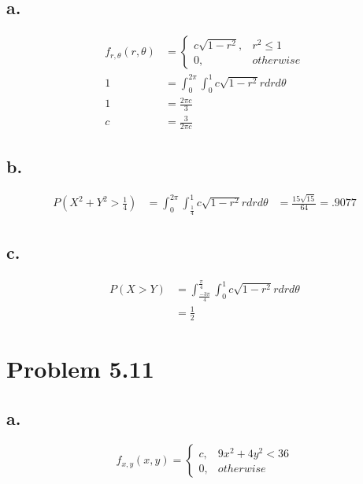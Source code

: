 \documentclass[12pt]{article}
\begin{document}
\subsection*{a.}
\begin{align*}
 f_{r,\theta}(r,\theta) &= 
 \begin{cases}
   c\sqrt{1-r^2}, & r^2 \leq 1 \\
   0, & otherwise
 \end{cases} \\
 1 &= \int_0^{2\pi} \int_0^1 c\sqrt{1-r^2}rdrd\theta \\
 1 &= \frac{2\pi c}{3} \\
 c &= \frac{3}{2\pi c}
\end{align*}

\subsection*{b.}
\begin{align*}
  P(X^2 + Y^2 > \frac{1}{4}) &= \int_0^{2\pi} \int_\frac{1}{4}^1 c\sqrt{1-r^2}rdrd\theta
  &= \frac{15\sqrt{15}}{64} = .9077
\end{align*}

\subsection*{c.}
\begin{align*}
  P(X>Y) &= \int_{\frac{-3\pi}{4}}^{\frac{\pi}{4}} \int_0^1 c\sqrt{1-r^2}rdrd\theta \\
  &= \frac{1}{2}
\end{align*}

\section*{Problem 5.11}
\subsection*{a.}
\[f_{x,y}(x,y) = 
\begin{cases}
c, & 9x^2 + 4y^2  < 36 \\
0, & otherwise
\end{cases}
\]
\end{document}
